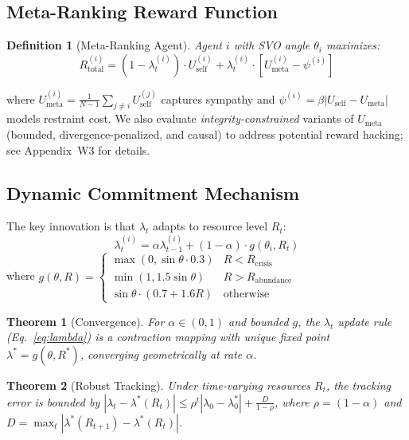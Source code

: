 \documentclass{article}
\newtheorem{theorem}{Theorem}
\newtheorem{definition}{Definition}
\begin{document}
\subsection{Meta-Ranking Reward Function}

\begin{definition}[Meta-Ranking Agent]
Agent $i$ with SVO angle $\theta_i$ maximizes:
\begin{equation}
R_{\text{total}}^{(i)} = (1 - \lambda_t^{(i)}) \cdot U_{\text{self}}^{(i)}
  + \lambda_t^{(i)} \cdot \left[ U_{\text{meta}}^{(i)} - \psi^{(i)} \right]
\label{eq:reward}
\end{equation}
\end{definition}

\noindent where $U_{\text{meta}}^{(i)} = \frac{1}{N-1}\sum_{j \neq i} U_{\text{self}}^{(j)}$ captures sympathy and $\psi^{(i)} = \beta |U_{\text{self}} - U_{\text{meta}}|$ models restraint cost. We also evaluate \textit{integrity-constrained} variants of $U_{\text{meta}}$ (bounded, divergence-penalized, and causal) to address potential reward hacking; see Appendix~W3 for details.

\subsection{Dynamic Commitment Mechanism}

The key innovation is that $\lambda_t$ adapts to resource level $R_t$:
\begin{equation}
\lambda_t^{(i)} = \alpha \lambda_{t-1}^{(i)} + (1-\alpha) \cdot g(\theta_i, R_t)
\label{eq:lambda}
\end{equation}
where $g(\theta, R) = \begin{cases}
\max(0, \sin\theta \cdot 0.3) & R < R_{\text{crisis}} \\
\min(1, 1.5\sin\theta) & R > R_{\text{abundance}} \\
\sin\theta \cdot (0.7 + 1.6R) & \text{otherwise}
\end{cases}$

\begin{theorem}[Convergence]
\label{thm:convergence}
For $\alpha \in (0,1)$ and bounded $g$, the $\lambda_t$ update rule (Eq.~\ref{eq:lambda}) is a contraction mapping with unique fixed point $\lambda^* = g(\theta, R^*)$, converging geometrically at rate $\alpha$.
\end{theorem}

\begin{theorem}[Robust Tracking]
\label{thm:tracking}
Under time-varying resources $R_t$, the tracking error is bounded by $|\lambda_t - \lambda^*(R_t)| \le \rho^t |\lambda_0 - \lambda^*_0| + \frac{D}{1-\rho}$, where $\rho = (1-\alpha)$ and $D = \max_t |\lambda^*(R_{t+1}) - \lambda^*(R_t)|$.
\end{theorem}
\end{document}
